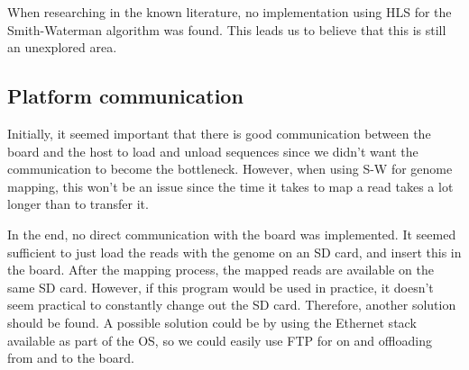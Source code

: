 When researching in the known literature, no implementation using HLS for the Smith-Waterman algorithm was found. This leads us to believe that this is still an unexplored area.

\subsection{Platform communication}

Initially, it seemed important that there is good communication between the board and the host to load and unload sequences since we didn't want the communication to become the bottleneck. However, when using S-W for genome mapping, this won't be an issue since the time it takes to map a read takes a lot longer than to transfer it.

In the end, no direct communication with the board was implemented. It seemed sufficient to just load the reads with the genome on an SD card, and insert this in the board. After the mapping process, the mapped reads are available on the same SD card. However, if this program would be used in practice, it doesn't seem practical to constantly change out the SD card. Therefore, another solution should be found. A possible solution could be by using the Ethernet stack available as part of the OS, so we could easily use FTP for on and offloading from and to the board.

